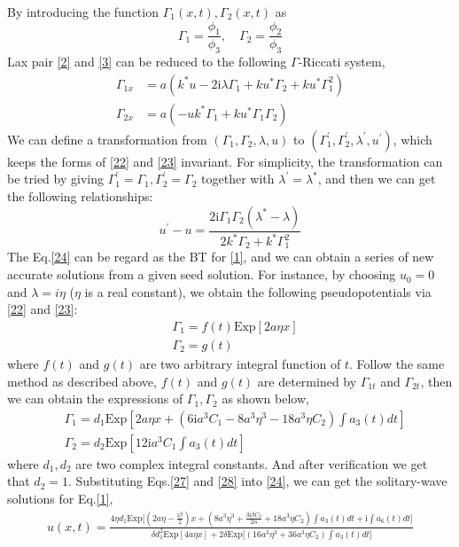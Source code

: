 \documentclass[12pt]{article}
\begin{document}
By introducing the function $\Gamma_{1}(x,t), \Gamma_{2}(x,t)$ as
\begin{equation}
  \Gamma_{1} = \frac{\phi_{1}}{\phi_{3}}, \quad \Gamma_{2} = \frac{\phi_{2}}{\phi_{3}}
\end{equation}
Lax pair \eqref{2} and \eqref{3} can be reduced to the following $\Gamma$-Riccati system,
\begin{align}
  \Gamma_{1x} &= a(k^{*}u - 2\mathrm{i}\lambda \Gamma_{1} + ku^{*}\Gamma_{2} + ku^{*}\Gamma_{1}^{2}) \label{22} \\
  \Gamma_{2x} &= a(-uk^{*}\Gamma_{1} + ku^{*}\Gamma_{1}\Gamma_{2})  \label{23}
\end{align}
We can define a transformation from $(\Gamma_{1}, \Gamma_{2}, \lambda, u)$ to $(\Gamma_{1}^{'}, \Gamma_{2}^{'}, \lambda^{'}, u^{'})$, which keeps the forms of \eqref{22} and \eqref{23} invariant. For simplicity, the transformation can be tried by giving $\Gamma_{1}^{'} = \Gamma_{1}, \Gamma_{2}^{'} = \Gamma_{2}$ together with $\lambda^{'} = \lambda^{*}$, and then we can get the following relationships:
\begin{equation}
  u^{'} - u = \frac{2\mathrm{i}\Gamma_{1}\Gamma_{2}(\lambda^{*}-\lambda)}{2k^{*}\Gamma_{2} + k^{*}\Gamma_{1}^{2}} \label{24}
\end{equation}
The Eq.\eqref{24} can be regard as the BT for \eqref{1}, and we can obtain a series of new accurate solutions from a given seed solution. For instance, by choosing $u_{0} = 0$ and $\lambda = i\eta$ ($\eta$ is a real constant), we obtain the following pseudopotentials via \eqref{22} and \eqref{23}:
\begin{align}
  & \Gamma_{1} = f(t)\mathrm{Exp}[2a\eta x] \\
  & \Gamma_{2} = g(t)
\end{align}
where $f(t)$ and $g(t)$ are two arbitrary integral function of $t$. Follow the same method as described above, $f(t)$ and $g(t)$ are determined by $\Gamma_{1t}$ and $\Gamma_{2t}$, then we can obtain the expressions of $\Gamma_{1}, \Gamma_{2}$ as shown below,
\begin{align}
  & \Gamma_{1} = d_{1}\mathrm{Exp}\left[2a\eta x + (6\mathrm{i}a^{3}C_{1} - 8a^{3}\eta^{3} - 18a^{3}\eta C_{2})\int a_{3}(t)dt\right] \label{27}\\
  & \Gamma_{2} = d_{2}\mathrm{Exp}\left[12\mathrm{i}a^{3}C_{1}\int a_{3}(t)dt\right] \label{28}
\end{align}
where $d_{1}, d_{2}$ are two complex integral constants. And after verification we get that $d_{2} = 1$. Substituting Eqs.\eqref{27} and \eqref{28} into \eqref{24}, we can get the solitary-wave solutions for Eq.\eqref{1},
\begin{align}
    u(x,t) = \frac{4\eta d_{1}\mathrm{Exp}\Big[(2a\eta-\frac{\mathrm{i}\beta}{2})x + (8a^{3}\eta^{3}+\frac{3\mathrm{i}\beta C_{2}}{2\alpha} + 18a^{3}\eta C_{2})\int a_{3}(t)dt + \mathrm{i}\int a_{6}(t)dt\Big]}{\delta d_{1}^{2}\mathrm{Exp}[4a\eta x] + 2\delta \mathrm{Exp}\Big[(16a^{3}\eta^{3}+36a^{3}\eta C_{2})\int a_{3}(t)dt\Big]}
\end{align}
\end{document}
